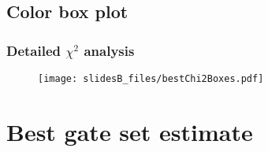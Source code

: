 \documentclass{beamer}
\begin{document}
{\subsection{Color box plot}
\begin{frame}
\frametitle{Detailed $\chi^2$ analysis}

\begin{figure}
\begin{center}
\texttt{[image: slidesB\_files/bestChi2Boxes.pdf]}
\end{center}
\end{figure}
\end{frame}

}{}

\section{Best gate set estimate}
\end{document}

